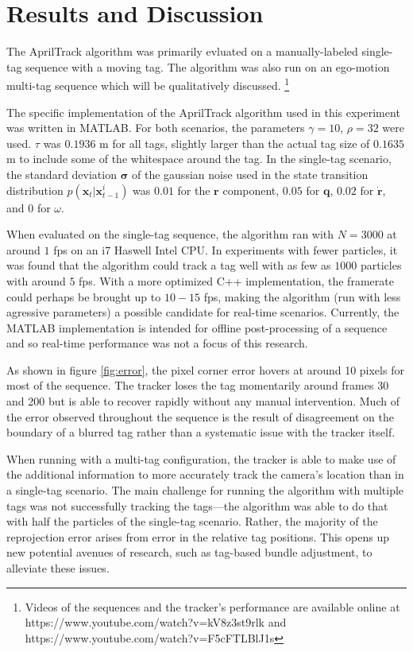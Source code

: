 \documentclass[letterpaper, 10 pt, conference]{ieeeconf}
\renewcommand{\vec}[1]{\boldsymbol{#1}}
\begin{document}
\section{Results and Discussion}

The AprilTrack algorithm was primarily evluated on a manually-labeled single-tag sequence with a moving tag. The algorithm was also run on an ego-motion multi-tag sequence which will be qualitatively discussed.
\footnote{Videos of the sequences and the tracker's performance are available online at https://www.youtube.com/watch?v=kV8z3st9rlk and https://www.youtube.com/watch?v=F5cFTLBlJ1s }


The specific implementation of the AprilTrack algorithm used in this experiment was written in MATLAB. For both scenarios, the parameters $\gamma = 10$, $\rho=32$ were used. $\tau$ was $0.1936$ m for all tags, slightly larger than the actual tag size of $0.1635$ m to include some of the whitespace around the tag. In the single-tag scenario, the standard deviation $\vec{\sigma}$  of the gaussian noise used in the state transition distribution $p(\vec{x}_t|\vec{x}^i_{t-1})$ was $0.01$ for the $\vec{r}$ component, $0.05$ for $\vec{q}$, $0.02$ for $\dot{\vec{r}}$, and $0$ for $\omega$.


When evaluated on the single-tag sequence, the algorithm ran with $N=3000$ at around $1$ fps on an i7 Haswell Intel CPU. In experiments with fewer particles, it was found that the algorithm could track a tag well with as few as $1000$ particles with around $5$ fps. With a more optimized C++ implementation, the framerate could perhaps be brought up to $10-15$ fps, making the algorithm (run with less agressive parameters) a possible candidate for real-time scenarios. Currently, the MATLAB implementation is intended for offline post-processing of a sequence and so real-time performance was not a focus of this research.


As shown in figure \ref{fig:error}, the pixel corner error hovers at around 10 pixels for most of the sequence. The tracker loses the tag momentarily around frames 30 and 200 but is able to recover rapidly without any manual intervention. Much of the error observed throughout the sequence is the result of disagreement on the boundary of a blurred tag rather than a systematic issue with the tracker itself.

When running with a multi-tag configuration, the tracker is able to make use of the additional information to more accurately track the camera's location than in a single-tag scenario. The main challenge for running the algorithm with multiple tags was not successfully tracking the tags---the algorithm was able to do that with half the particles of the single-tag scenario. Rather, the majority of the reprojection error arises from error in the relative tag positions. This opens up new potential avenues of research, such as tag-based bundle adjustment, to alleviate these issues.
\end{document}
